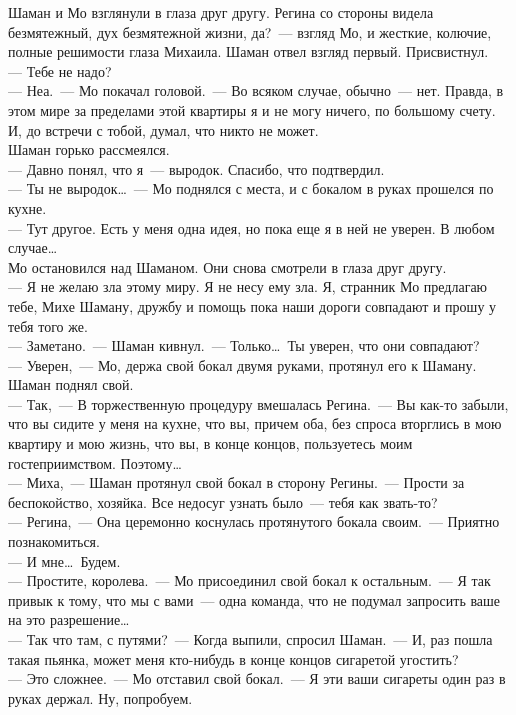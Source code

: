 Шаман и Мо взглянули в глаза друг другу. Регина со стороны видела безмятежный, 
дух безмятежной жизни, да?~--- взгляд Мо, и жесткие, колючие, полные решимости 
глаза Михаила. Шаман отвел взгляд первый. Присвистнул.\\
--- Тебе не надо?\\
--- Неа.~--- Мо покачал головой.~--- Во всяком случае, обычно~--- нет. Правда, в 
этом мире за пределами этой квартиры я и не могу ничего, по большому счету. И, до 
встречи с тобой, думал, что никто не может.\\
Шаман горько рассмеялся.\\
--- Давно понял, что я~--- выродок. Спасибо, что подтвердил.\\
--- Ты не выродок\ldots~--- Мо поднялся с места, и с бокалом в руках прошелся по 
кухне.\\ 
--- Тут другое. Есть у меня одна идея, но пока еще я в ней не уверен. В любом 
случае\ldots\\
Мо остановился над Шаманом. Они снова смотрели в глаза друг другу.\\
--- Я не желаю зла этому миру. Я не несу ему зла. Я, странник Мо предлагаю тебе, 
Михе Шаману, дружбу и помощь пока наши дороги совпадают и прошу у тебя того же.\\
--- Заметано.~--- Шаман кивнул.~--- Только\ldots\ Ты уверен, что они совпадают?\\
--- Уверен,~--- Мо, держа свой бокал двумя руками, протянул его к Шаману. Шаман 
поднял свой.\\
--- Так,~--- В торжественную процедуру вмешалась Регина.~--- Вы как-то забыли, 
что вы сидите у меня на кухне, что вы, причем оба, без спроса вторглись в мою квартиру 
и мою жизнь, что вы, в конце концов, пользуетесь моим гостеприимством. 
Поэтому\ldots\\
--- Миха,~--- Шаман протянул свой бокал в сторону Регины.~--- Прости за 
беспокойство, хозяйка. Все недосуг узнать было~--- тебя как звать-то?\\
--- Регина,~--- Она церемонно коснулась протянутого бокала своим.~--- Приятно 
познакомиться.\\
--- И мне\ldots\ Будем.\\
--- Простите, королева.~--- Мо присоединил свой бокал к остальным.~--- Я так 
привык к тому, что мы с вами~--- одна команда, что не подумал запросить ваше на это 
разрешение\ldots\\
--- Так что там, с путями?~--- Когда выпили, спросил Шаман.~--- И, раз пошла 
такая пьянка, может меня кто-нибудь в конце концов сигаретой угостить?\\
--- Это сложнее.~--- Мо отставил свой бокал.~--- Я эти ваши сигареты один раз в 
руках держал. Ну, попробуем.

